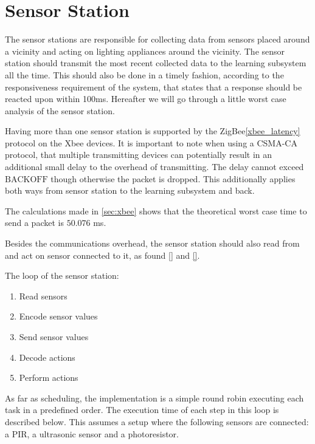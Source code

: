 \section{Sensor Station}\label{sub:sensorStation}

The sensor stations are responsible for collecting data from sensors placed around a vicinity and acting on lighting appliances around the vicinity. The sensor station should transmit the most recent collected data to the learning subsystem all the time. This should also be done in a timely fashion, according to the responsiveness requirement of the system, that states that a response should be reacted upon within 100ms. Hereafter we will go through a little worst case analysis of the sensor station.

Having more than one sensor station is supported by the ZigBee\cref{xbee_latency} protocol on the Xbee devices. It is important to note when using a CSMA-CA protocol, that multiple transmitting devices can potentially result in an additional small delay to the overhead of transmitting. The delay cannot exceed $\text{BACKOFF}$ though otherwise the packet is dropped. This additionally applies both ways from sensor station to the learning subsystem and back.

The calculations made in \cref{sec:xbee} shows that the theoretical worst case time to send a packet is $50.076$ ms.

Besides the communications overhead, the sensor station should also read from and act on sensor connected to it,  as found \cref{} and \cref{}.

The loop of the sensor station:
\begin{enumerate}
  \item Read sensors
  \item Encode sensor values
  \item Send sensor values
  \item Decode actions
  \item Perform actions
\end{enumerate}

As far as scheduling, the implementation is a simple round robin executing each task in a predefined order. The execution time of each step in this loop is described below. This assumes a setup where the following sensors are connected: a PIR, a ultrasonic sensor and a photoresistor.

